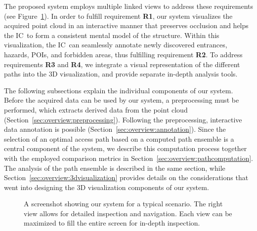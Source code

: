 \documentclass[review,journal]{vgtc}         %
\def\IC{IC}
\begin{document}
The proposed system employs multiple linked views to address these requirements (see Figure~\ref{sec:overview:system}). In order to fulfill requirement {\bfseries R1}, our system visualizes the acquired point cloud in an interactive manner that preserves occlusion and helps the \IC\ to form a consistent mental model of the structure. Within this visualization, the \IC\ can seamlessly annotate newly discovered entrances, hazards, POIs, and forbidden areas, thus fulfilling requirement {\bfseries R2}. To address requirements {\bfseries R3} and {\bfseries R4}, we integrate a visual representation of the different paths into the 3D visualization, and provide separate in-depth analysis tools.

The following subsections explain the individual components of our system. Before the acquired data can be used by our system, a preprocessing must be performed, which extracts derived data from the point cloud (Section~\ref{sec:overview:preprocessing}). Following the preprocessing, interactive data annotation is possible (Section~\ref{sec:overview:annotation}). Since the selection of an optimal access path based on a computed path ensemble is a central component of the system, we describe this computation process together with the employed comparison metrics in Section~\ref{sec:overview:pathcomputation}. The analysis of the path ensemble is described in the same section, while Section~\ref{sec:overview:3dvisualization} provides details on the considerations that went into designing the 3D visualization components of our system.

\begin{figure}
    \centering
    \caption{A screenshot showing our system for a typical scenario. The right view allows for detailed inspection and navigation. Each view can be maximized to fill the entire screen for in-depth inspection.}
    \label{sec:overview:system}
\end{figure}
\end{document}
